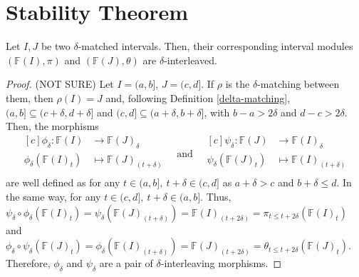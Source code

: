 \newpage
\section{Stability Theorem}

\begin{lemma} \label{interval-interleaving-if-matching} %
    Let $ I, J $ be two $\delta$-matched intervals. Then, their corresponding interval modules $ (\mathbb F (I), \pi) $ and $( \mathbb F (J), \theta) $ are $\delta$-interleaved.
\end{lemma}
\begin{proof}
    (NOT SURE)
    Let $ I = (a, b] $, $ J = (c, d] $. If $\rho$ is the $\delta$-matching between them, then $ \rho(I) = J $ and, following Definition \ref{delta-matching}, $ (a, b] \subseteq (c+\delta, d+\delta] $ and $ (c, d] \subseteq (a+\delta, b+\delta] $, with $ b - a > 2\delta $ and $ d - c > 2\delta $. Then, the morphisms
    \begin{equation*}
        \begin{aligned}[c]
        \phi_\delta: \mathbb F(I) &\to \mathbb F(J)_\delta\\
        \phi_\delta(\mathbb F(I)_t) &\mapsto \mathbb F(J)_{(t+\delta)}\\
        \end{aligned}
        \quad \text{and} \quad
        \begin{aligned}[c]
        \psi_\delta: \mathbb F(J) &\to \mathbb F(I)_\delta\\
        \psi_\delta(\mathbb F(J)_t) &\mapsto \mathbb F(I)_{(t+\delta)}\\
        \end{aligned}
    \end{equation*}
    are well defined as for any $ t \in (a,b], \ t + \delta \in (c, d] $ as $ a + \delta > c $ and $ b + \delta \leq d $. In the same way, for any $ t \in (c,d], \ t + \delta \in (a, b] $. Thus, $ \psi_\delta \circ \phi_\delta (\mathbb F(I)_t) = \psi_\delta(\mathbb F(J)_{(t+\delta)}) = \mathbb F(I)_{(t+2\delta)} = \pi_{t \leq t+2\delta}(\mathbb F(I)_t)$ and $ \phi_\delta \circ \psi_\delta (\mathbb F(J)_t) = \phi_\delta(\mathbb F(I)_{(t+\delta)}) = \mathbb F(J)_{(t+2\delta)} = \theta_{t \leq t+2\delta}(\mathbb F(J)_t)$. Therefore, $ \phi_\delta $ and $ \psi_\delta $ are a pair of $\delta$-interleaving morphisms.
\end{proof}

